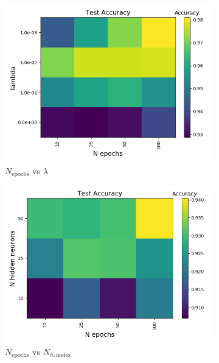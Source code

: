 \documentclass[a4paper]{article}
\newcommand{\Nepochs}{N_{\text{epochs}}}
\newcommand{\Nhn}{N_{h,\text{nodes}}}
\begin{document}
\begin{figure}[H]
\begin{subfigure}{0.49\textwidth}
    \includegraphics[scale=0.45]{../figures/task_d/test/heatmap_test_lr_constant_Nhyp443431_Accuracy_n_epochs_lambdas.png}
    \caption{$\Nepochs$ vs $\lambda$}
  \end{subfigure}
  \begin{subfigure}{0.49\textwidth}
    \includegraphics[scale=0.45]{../figures/task_d/test/heatmap_test_lr_constant_Nhyp443431_Accuracy_n_epochs_nhn.png}
    \caption{$\Nepochs$ vs $\Nhn$}
  \end{subfigure}\\
    \begin{subfigure}{0.49\textwidth}

\end{subfigure}
\end{figure}
\end{document}
